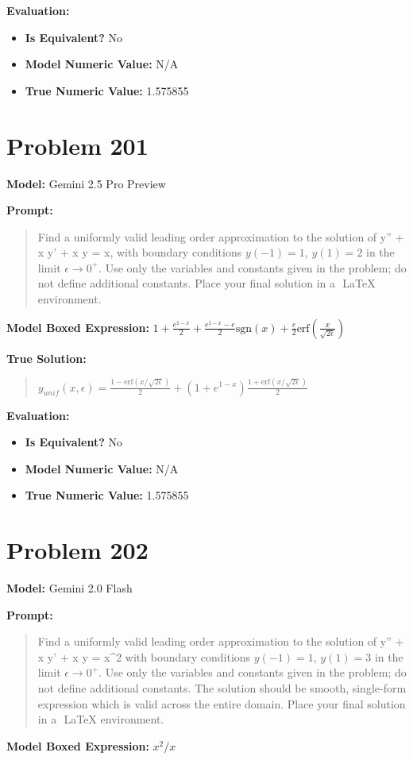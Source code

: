 \documentclass{article}
\begin{document}
{\textbf{Evaluation:}
\begin{itemize}
\item \textbf{Is Equivalent?} No
\item \textbf{Model Numeric Value:} N/A
\item \textbf{True Numeric Value:} 1.575855
\end{itemize}
\vspace{1cm}
\section*{Problem 201}
\textbf{Model:} Gemini 2.5 Pro Preview

\textbf{Prompt:}
\begin{quote}
Find a uniformly valid leading order approximation to the solution of \epsilon y'' + x y' + x y = x, with boundary conditions $y(-1) = 1$, $y(1) = 2$ in the limit $\epsilon \to 0^+$. Use only the variables and constants given in the problem; do not define additional constants. Place your final solution in a $\boxed{}$ LaTeX environment.
\end{quote}
\textbf{Model Boxed Expression:} $1 + \frac{e^{1-x}}{2} + \frac{e^{1-x}-e}{2}\text{sgn}(x) + \frac{e}{2}\text{erf}\left(\frac{x}{\sqrt{2\epsilon}}\right)$

\textbf{True Solution:}
\begin{quote}
$y_{unif}(x, \epsilon) = \frac{1-\text{erf}(x/\sqrt{2\epsilon})}{2} + (1+e^{1-x}) \frac{1+\text{erf}(x/\sqrt{2\epsilon})}{2}$
\end{quote}

\textbf{Evaluation:}
\begin{itemize}
\item \textbf{Is Equivalent?} No
\item \textbf{Model Numeric Value:} N/A
\item \textbf{True Numeric Value:} 1.575855
\end{itemize}
\vspace{1cm}
\section*{Problem 202}
\textbf{Model:} Gemini 2.0 Flash

\textbf{Prompt:}
\begin{quote}
Find a uniformly valid leading order approximation to the solution of \epsilon y'' + x y' + x y = x^2 with boundary conditions $y(-1) = 1$, $y(1) = 3$ in the limit $\epsilon \to 0^+$. Use only the variables and constants given in the problem; do not define additional constants. The solution should be smooth, single-form expression which is valid across the entire domain. Place your final solution in a $\boxed{}$ LaTeX environment.
\end{quote}
\textbf{Model Boxed Expression:} $x^2/x$

}
\end{document}
